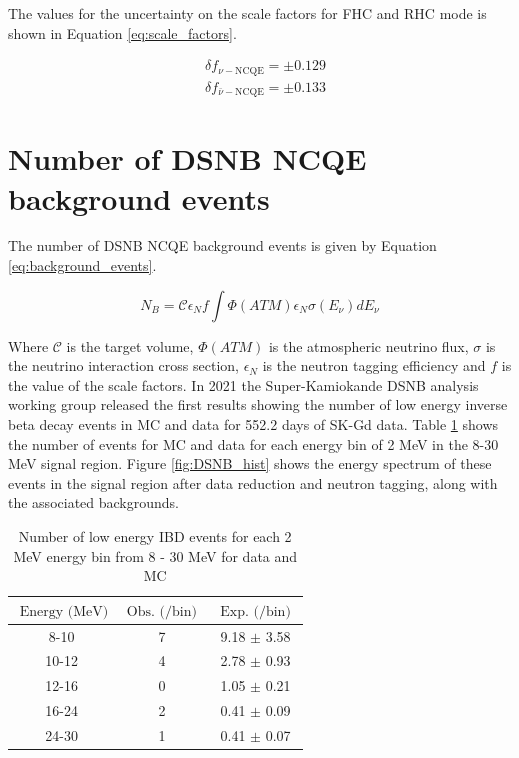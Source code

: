 The values for the uncertainty on the scale factors for FHC and RHC mode is shown in Equation \ref{eq:scale_factors}.


\begin{equation}
    \begin{aligned}
    & \delta{f_{\nu-\mathrm{NCQE}}}= \pm 0.129 \\
    & \delta{f_{\bar{\nu}-\mathrm{NCQE}}}= \pm 0.133
    \label{eq:scale_factors}
    \end{aligned}
\end{equation}


\section{Number of DSNB NCQE background events}

The number of DSNB NCQE background events is given by Equation \ref{eq:background_events}. 

\begin{equation}
N_{B} = \mathcal{C} \epsilon_{N} f\int \Phi(ATM) \epsilon_{N} \sigma(E_{\nu}) d E_{\nu} 
\label{eq:background_events}
\end{equation}

Where $\mathcal{C}$ is the target volume, $\Phi(ATM)$ is the atmospheric neutrino flux, $\sigma$ is the neutrino interaction cross section, $\epsilon_{N}$ is the neutron tagging efficiency and $f$ is the value of the scale factors. In 2021 the Super-Kamiokande DSNB analysis working group released the first results showing the number of low energy inverse beta decay events in MC and data for 552.2 days of SK-Gd data. Table \ref{table:DSNB_analysis} shows the number of events for MC and data for each energy bin of 2 MeV in the 8-30 MeV signal region. Figure \ref{fig:DSNB_hist} shows the energy spectrum of these events in the signal region after data reduction and neutron tagging, along with the associated backgrounds.

\begin{table}[!htb]
\centering
\begin{tabular}{||ccc||}
\hline
$\text{ Energy (MeV)}$ & $\text{ Obs. (/bin) }$ & $\text{ Exp. (/bin) }$\\
\hline 
8-10 & 7 & 9.18 $\pm$ 3.58 \\
10-12 & 4 & 2.78 $\pm$ 0.93 \\
12-16 & 0 & 1.05 $\pm$ 0.21 \\
16-24 & 2 & 0.41 $\pm$ 0.09 \\
24-30 & 1 & 0.41 $\pm$ 0.07 \\
\hline
\end{tabular}
\caption{Number of low energy IBD events for each 2 MeV energy bin from 8 - 30 MeV for data and MC}
\label{table:DSNB_analysis}
\end{table}


